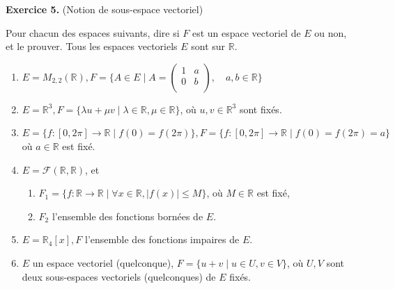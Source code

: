 \documentclass[a4paper, 10pt]{report}
\begin{document}
	\newpage
	\vspace{5mm}
	\noindent \textbf{Exercice 5.} (Notion de sous-espace vectoriel)
	
	\indent Pour chacun des espaces suivants, dire si $F$ est un espace vectoriel de $E$ ou non, et le prouver. Tous les espaces vectoriels $E$ sont sur $\mathbb{R}$.
	
	\begin{enumerate}[label=\arabic*.]
		\item $E = M_{2, 2}(\mathbb{R}), F = \bigg\{ A \in E \mid A = 
		\begin{pmatrix}
			1& a\\
			0& b\\
		\end{pmatrix}
		, \quad a, b \in \mathbb{R} \bigg\}$
		\item $E = \mathbb{R}^3, F = \{\lambda u + \mu v \mid \lambda \in \mathbb{R}, \mu \in \mathbb{R}\}$, où $u, v \in \mathbb{R}^3$ sont fixés.
		\item $E = \{f : [0, 2\pi] \rightarrow \mathbb{R} \mid f(0) = f(2\pi)\}, F = \{f : [0, 2\pi] \rightarrow \mathbb{R} \mid f(0) = f(2\pi) = a\}$ où $a \in \mathbb{R}$ est fixé.
		\item $E = \mathcal{F}(\mathbb{R}, \mathbb{R})$, et
		\begin{enumerate}[label=(\alph*)]
			\item $F_1 = \{f : \mathbb{R} \rightarrow \mathbb{R} \mid \forall x \in \mathbb{R}, |f(x)| \leq M\}$, où $M \in \mathbb{R}$ est fixé,
			\item $F_2$ l'ensemble des fonctions bornées de $E$.
		\end{enumerate}
		\item $E = \mathbb{R}_4[x], F$ l'ensemble des fonctions impaires de $E$.
		\item $E$ un espace vectoriel (quelconque), $F = \{u + v \mid u \in U, v \in V\}$, où $U, V$ sont deux sous-espaces vectoriels (quelconques) de $E$ fixés.
	\end{enumerate}
	
\end{document}
